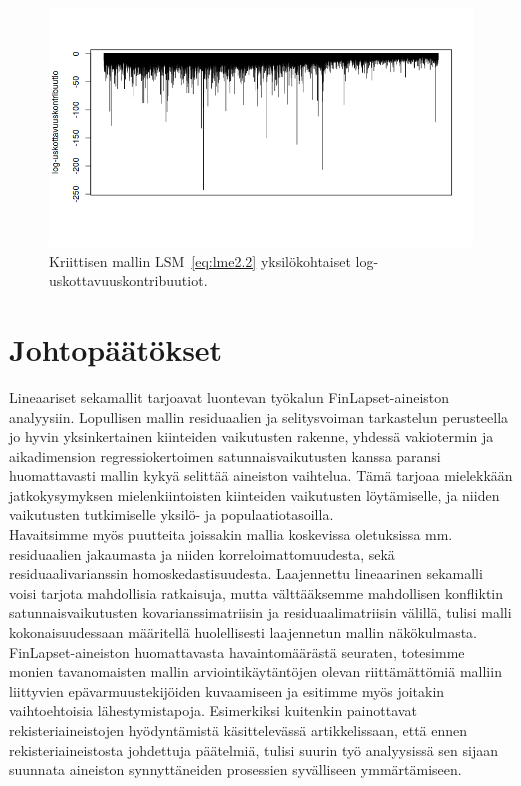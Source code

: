\documentclass[finnish]{docopts}
\begin{document}
\begin{figure}[H]
\centering
  \includegraphics[scale=0.6]{kuvaajat/log.png}
  \caption{Kriittisen mallin $\text{LSM}$~\ref{eq:lme2.2} yksilökohtaiset log-uskottavuuskontribuutiot.}
  \label{fig:logkontrib}
\end{figure}

\section{Johtopäätökset}


Lineaariset sekamallit tarjoavat luontevan työkalun FinLapset-aineiston analyysiin. Lopullisen mallin residuaalien ja selitysvoiman tarkastelun perusteella jo hyvin yksinkertainen kiinteiden vaikutusten rakenne, yhdessä vakiotermin ja aikadimension regressiokertoimen satunnaisvaikutusten kanssa paransi huomattavasti mallin kykyä selittää aineiston vaihtelua. Tämä tarjoaa mielekkään jatkokysymyksen mielenkiintoisten kiinteiden vaikutusten löytämiselle, ja niiden vaikutusten tutkimiselle yksilö- ja populaatiotasoilla.\\

Havaitsimme myös puutteita joissakin mallia koskevissa oletuksissa mm. residuaalien jakaumasta ja niiden korreloimattomuudesta, sekä residuaalivarianssin homoskedastisuudesta. Laajennettu lineaarinen sekamalli voisi tarjota mahdollisia ratkaisuja, mutta välttääksemme mahdollisen konfliktin satunnaisvaikutusten kovarianssimatriisin ja residuaalimatriisin välillä, tulisi malli kokonaisuudessaan määritellä huolellisesti laajennetun mallin näkökulmasta.\\

FinLapset-aineiston huomattavasta havaintomäärästä seuraten, totesimme monien tavanomaisten mallin arviointikäytäntöjen olevan riittämättömiä malliin liittyvien epävarmuustekijöiden kuvaamiseen ja esitimme myös joitakin vaihtoehtoisia lähestymistapoja. Esimerkiksi \cite{connelly2016} kuitenkin painottavat rekisteriaineistojen hyödyntämistä käsittelevässä artikkelissaan, että ennen rekisteriaineistosta johdettuja päätelmiä, tulisi suurin työ analyysissä sen sijaan suunnata aineiston synnyttäneiden prosessien syvälliseen ymmärtämiseen.\\
\end{document}
